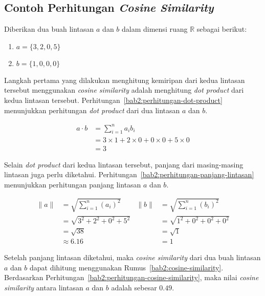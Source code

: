 \subsection{Contoh Perhitungan \textit{Cosine Similarity}}
\label{subsec:contoh-cosine}

Diberikan dua buah lintasan $a$ dan $b$ dalam dimensi ruang $\mathbb{R}$ sebagai berikut:

\begin{enumerate}
    \item $a = \{ 3, 2, 0, 5 \}$
    \item $b = \{ 1, 0, 0, 0 \}$
\end{enumerate}

Langkah pertama yang dilakukan menghitung kemiripan dari kedua lintasan tersebut menggunakan \textit{cosine similarity} adalah menghitung \textit{dot product} dari kedua lintasan tersebut. Perhitungan~\ref{bab2:perhitungan-dot-product} menunjukkan perhitungan \textit{dot product} dari dua lintasan $a$ dan $b$.

\begin{equation}
    \begin{aligned}
        a \cdot b & =  \sum_{i=1}^{n}{a_i b_i} \\
        & = 3 \times 1 + 2 \times 0 + 0 \times 0 + 5 \times 0 \\
        & = 3
    \end{aligned}
    \label{bab2:perhitungan-dot-product}
\end{equation}

Selain \textit{dot product} dari kedua lintasan tersebut, panjang dari masing-masing lintasan juga perlu diketahui. Perhitungan~\ref{bab2:perhitungan-panjang-lintasan} menunjukkan perhitungan panjang lintasan $a$ dan $b$.

\begin{equation}
    \begin{aligned}
        \|a\| & = \sqrt{\sum_{i=1}^{n}{(a_i)^2}} & \|b\| & = \sqrt{\sum_{i=1}^{n}{(b_i)^2}} \\
        & = \sqrt{3^2 + 2^2 + 0^2 + 5^2} & & = \sqrt{1^2 + 0^2 + 0^2 + 0^2}  \\
        & = \sqrt{38} & & = \sqrt{1} \\
        & \approx 6.16 & & = 1
    \end{aligned}
    \label{bab2:perhitungan-panjang-lintasan}
\end{equation}

Setelah panjang lintasan diketahui, maka \textit{cosine similarity} dari dua buah lintasan $a$ dan $b$ dapat dihitung menggunakan Rumus~\ref{bab2:cosine-similarity}. Berdasarkan Perhitungan~\ref{bab2:perhitungan-cosine-similarity}, maka nilai \textit{cosine similarity} antara lintasan $a$ dan $b$ adalah sebesar $0.49$.

